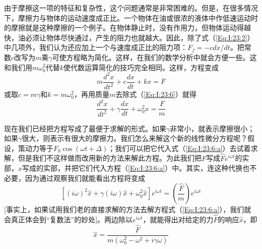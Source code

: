由于摩擦这一项的特征和复杂性，这个问题通常是非常困难的。但是，在很多情况下，摩擦力与物体的运动速度成正比。一个物体在油或很浓的液体中作低速运动时的摩擦就是这种摩擦的一个例子。在物体静止时，没有作用力，但物体运动得越快，油必须让物体尽快通过，产生的阻力也就越大。因此，除了式（\ref{Eq:I:23:2}）中几项外，我们认为还应加上一个与速度成正比的阻力项：$F_f=-cdx/dt$。把常数$c$改写为$m$乘$\gamma$可使方程略为简化。这样，在我们的数学分析中就会方便一些。这和我们用$m\omega_0^2$代替$k$使代数运算简化的技巧完全相同。这样，方程变成
\begin{equation}
    \label{Eq:I:23:6}
    m\frac{d^2x}{dt^2} + c\frac{dx}{dt} + kx = F
\end{equation}
或取$c=m\gamma$和$k=m\omega_0^2$，再用质量$m$去除式（\ref{Eq:I:23:6}）就得
\begin{equation*}
    \label{Eq:I:23:6:a}
    \frac{d^2x}{dt^2} + \gamma\frac{dx}{dt} + \omega_0^2x = \frac{F}{m} \tag{23.6a}
\end{equation*}

现在我们已经把方程写成了最便于求解的形式。如果$\gamma$非常小，就表示摩擦很小；如果$\gamma$很大，则表示有很大的摩擦力。我们怎么来解这个新的线性微分方程呢？假设，策动力等于$F_0\cos(\omega t+\Delta)$；我们可以把它代入式（\ref{Eq:I:23:6:a}）去试着求解，但是我们不这样做而改用新的方法来解此方程。为此我们把$F$写成$\hat{F}e^{i\omega t}$的实部，$x$写成的实部，并把它们代入方程（\ref{Eq:I:23:6:a}）中。其实，连这种代换也不必要，因为通过观察我们就能看出方程将变成
\begin{equation}
    \label{Eq:I:23:7}
    [(i\omega)^2\hat{x} + \gamma(i\omega)\hat{x} + \omega_0^2\hat{x}]e^{i\omega t} = \left (\frac{\hat{F}}{m} \right ) e^{i\omega t}
\end{equation}
[事实上，如果试用我们老的直接求解的方法去解方程式（\ref{Eq:I:23:6:a}），我们就会真正体会到“复数法”的妙处]。两边除以$e^{i\omega t}$，就能得出对给定的力$\hat{F}$的响应$\hat{x}$，即
\begin{equation}
    \label{Eq:I:23:8}
    \hat{x} = \frac{\hat{F}}{m(\omega_0^2 - \omega^2 + i\gamma\omega)}
\end{equation}

